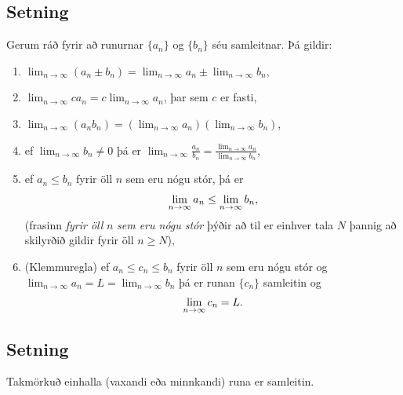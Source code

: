 \documentclass[b5paper,10pt,icelandic]{sphinxmanual}
\begin{document}
\subsection{Setning}
\label{kafli09:id4}
Gerum ráð fyrir að runurnar \(\{a_n\}\) og \(\{b_n\}\) séu
samleitnar. Þá gildir:
\begin{enumerate}
\item {} 
\(\lim_{n\rightarrow\infty}(a_n\pm b_n)=
\lim_{n\rightarrow\infty}a_n\pm\lim_{n\rightarrow\infty}b_n\),

\item {} 
\(\lim_{n\rightarrow\infty}ca_n=
c\lim_{n\rightarrow\infty}a_n\), þar sem \(c\) er fasti,

\item {} 
\(\lim_{n\rightarrow\infty}(a_n b_n)=
(\lim_{n\rightarrow\infty}a_n)(\lim_{n\rightarrow\infty}b_n)\),

\item {} 
ef \(\lim_{n\rightarrow\infty}b_n\neq 0\) þá er
\(\lim_{n\rightarrow\infty}\frac{a_n}{b_n}=
\frac{\lim_{n\rightarrow\infty}a_n}{\lim_{n\rightarrow\infty}b_n}\),

\item {} 
ef \(a_n\leq b_n\) fyrir öll \(n\) sem eru nógu stór, þá
er
\begin{gather}
\begin{split}\lim_{n\rightarrow\infty}a_n\leq\lim_{n\rightarrow\infty}b_n,\end{split}\notag
\end{gather}
(frasinn \emph{fyrir öll} \(n\) \emph{sem eru nógu stór} þýðir að til er
einhver tala \(N\) þannig að skilyrðið gildir fyrir öll
\(n\geq N\)),

\item {} 
(Klemmuregla) ef \(a_n\leq c_n\leq b_n\) fyrir öll \(n\)
sem eru nógu stór og
\(\lim_{n\rightarrow\infty}a_n=L=\lim_{n\rightarrow\infty}b_n\)
þá er runan \(\{c_n\}\) samleitin og
\begin{gather}
\begin{split}\lim_{n\rightarrow\infty}c_n=L.\end{split}\notag
\end{gather}
\end{enumerate}


\subsection{Setning}
\label{kafli09:id5}
Takmörkuð einhalla (vaxandi eða minnkandi) runa er samleitin.
\end{document}
